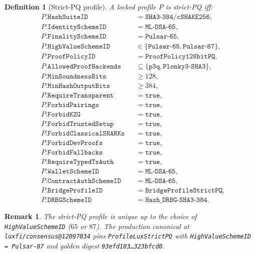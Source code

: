 \documentclass[11pt,a4paper]{article}
\newtheorem{definition}{Definition}
\newtheorem{remark}{Remark}
\begin{document}
\begin{definition}[Strict-PQ profile]
\label{def:strict-pq}
A locked profile $P$ is \emph{strict-PQ} iff:
\begin{align*}
& P.\texttt{HashSuiteID}            && = \texttt{SHA3-384/cSHAKE256}, \\
& P.\texttt{IdentitySchemeID}       && = \texttt{ML-DSA-65}, \\
& P.\texttt{FinalitySchemeID}       && = \texttt{Pulsar-65}, \\
& P.\texttt{HighValueSchemeID}      && \in \{\texttt{Pulsar-65}, \texttt{Pulsar-87}\}, \\
& P.\texttt{ProofPolicyID}          && = \texttt{ProofPolicy128bitPQ}, \\
& P.\texttt{AllowedProofBackends}   && \subseteq \{\texttt{p3q}, \texttt{Plonky3-SHA3}\}, \\
& P.\texttt{MinSoundnessBits}       && \ge 128, \\
& P.\texttt{MinHashOutputBits}      && \ge 384, \\
& P.\texttt{RequireTransparent}     && = \texttt{true}, \\
& P.\texttt{ForbidPairings}         && = \texttt{true}, \\
& P.\texttt{ForbidKZG}              && = \texttt{true}, \\
& P.\texttt{ForbidTrustedSetup}     && = \texttt{true}, \\
& P.\texttt{ForbidClassicalSNARKs}  && = \texttt{true}, \\
& P.\texttt{ForbidDevProofs}        && = \texttt{true}, \\
& P.\texttt{ForbidFallbacks}        && = \texttt{true}, \\
& P.\texttt{RequireTypedTxAuth}     && = \texttt{true}, \\
& P.\texttt{WalletSchemeID}         && = \texttt{ML-DSA-65}, \\
& P.\texttt{ContractAuthSchemeID}   && = \texttt{ML-DSA-65}, \\
& P.\texttt{BridgeProfileID}        && = \texttt{BridgeProfileStrictPQ}, \\
& P.\texttt{DRBGSchemeID}           && = \texttt{Hash\_DRBG-SHA3-384}.
\end{align*}
\end{definition}

\begin{remark}
The strict-PQ profile is unique up to the choice of
\texttt{HighValueSchemeID} ($65$ or $87$). The production canonical at
\texttt{luxfi/consensus@12097034} pins
\texttt{ProfileLuxStrictPQ} with \texttt{HighValueSchemeID = Pulsar-87}
and golden digest \texttt{93efd103\ldots323bfcd0}.
\end{remark}
\end{document}
